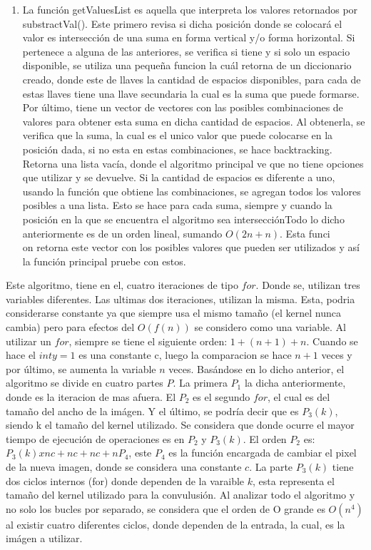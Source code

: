 \documentclass[conference]{IEEEtran}
\begin{document}
\begin{enumerate}[I]
\item La funci\'on getValuesList es aquella que interpreta los valores retornados por substractVal(). Este primero revisa si dicha posici\'on donde se colocar\'a el valor es intersecci\'on de una suma en forma vertical y/o forma horizontal. Si pertenece a alguna de las anteriores, se verifica si tiene y si solo un espacio disponible, se utiliza una pequeña funcion la cu\'al retorna de un diccionario creado, donde este de llaves la cantidad de espacios disponibles, para cada de estas llaves tiene una llave secundaria la cual es la suma que puede formarse. Por \'ultimo, tiene un vector de vectores con las posibles combinaciones de valores para obtener esta suma en dicha cantidad de espacios.  Al obtenerla, se verifica que la suma, la cual es el unico valor que puede colocarse en la posici\'on dada, si no esta en estas combinaciones, se hace backtracking. Retorna una lista vac\'ia, donde el algoritmo principal ve que no tiene opciones que utilizar y se devuelve. Si la cantidad de espacios es diferente a uno, usando la funci\'on que obtiene las combinaciones, se agregan todos los valores posibles a una lista. Esto se hace para cada suma, siempre y cuando la posici\'on en la que se encuentra el algoritmo sea intersecci\'onTodo lo dicho anteriormente es de un orden lineal, sumando $O(2n + n)$. Esta funci\\on retorna este vector con los posibles valores que pueden ser utilizados y as\'i la funci\'on principal pruebe con estos.
\end{enumerate}
Este algoritmo, tiene en el, cuatro iteraciones de tipo $for$. Donde se, utilizan tres variables diferentes. Las ultimas dos iteraciones, utilizan la misma. Esta, podria considerarse constante ya que siempre usa el mismo tamaño (el kernel nunca cambia) pero para efectos del $O(f(n))$ se considero como una variable.  Al utilizar un $for$, siempre se tiene el siguiente orden: $1 + (n+1) + n$.  Cuando se hace el $int y = 1$ es una constante c, luego la comparacion se hace $n+1$ veces y por \'ultimo, se aumenta la variable $n$ veces. Bas\'andose en lo dicho anterior, el algoritmo se divide en cuatro partes $P$. La primera $P_1$ la dicha anteriormente, donde es la iteracion de mas afuera. El $P_2$ es el segundo $for$, el cual es del tamaño del ancho de la im\'agen. Y el \'ultimo, se podr\'ia decir que es $P_3(k)$, siendo k el tamaño del kernel utilizado. Se considera que donde ocurre el mayor tiempo de ejecuci\'on de operaciones es en $P_2$ y $P_3(k)$. El orden $P_2$ es: $P_3(k) x nc + nc + nc + nP_4 
$, este $P_4$ es la funci\'on encargada de cambiar el pixel de la nueva imagen, donde se considera una constante $c$.  La parte $P_3(k) $ tiene dos ciclos internos (for) donde dependen de la varaible $k $, esta representa el tamaño del kernel utilizado para la convulusi\'on. Al analizar todo el algoritmo y no solo los bucles por separado, se considera que el orden de O grande es $O(n^4)$ al existir cuatro diferentes ciclos, donde dependen de la entrada, la cual, es la im\'agen a utilizar. \\
\end{document}
